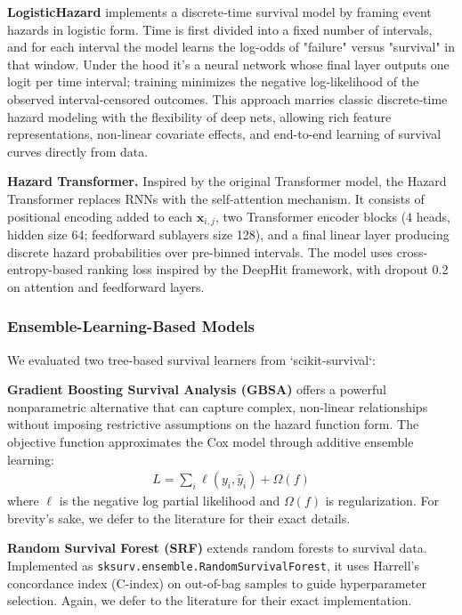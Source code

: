 \textbf{LogisticHazard} implements a discrete‐time survival model by framing event hazards in logistic form. Time is first divided into a fixed number of intervals, and for each interval the model learns the log-odds of "failure" versus "survival" in that window. Under the hood it's a neural network whose final layer outputs one logit per time interval; training minimizes the negative log‐likelihood of the observed interval‐censored outcomes. This approach marries classic discrete‐time hazard modeling with the flexibility of deep nets, allowing rich feature representations, non‐linear covariate effects, and end-to-end learning of survival curves directly from data.

\textbf{Hazard Transformer.} Inspired by the original Transformer model\citep{vaswani2017attention}, the Hazard Transformer \citep{hazard_transformer} replaces RNNs with the self-attention mechanism. It consists of positional encoding added to each $\mathbf{x}_{i,j}$, two Transformer encoder blocks (4 heads, hidden size 64; feedforward sublayers size 128), and a final linear layer producing discrete hazard probabilities over pre-binned intervals. The model uses cross-entropy-based ranking loss inspired by the DeepHit framework, with dropout 0.2 on attention and feedforward layers.

\subsubsection{Ensemble-Learning-Based Models}

We evaluated two tree-based survival learners from `scikit-survival`:

\textbf{Gradient Boosting Survival Analysis (GBSA)} \citep{chen2013gradient_GBSA} offers a powerful nonparametric alternative that can capture complex, non-linear relationships without imposing restrictive assumptions on the hazard function form. The objective function approximates the Cox model through additive ensemble learning:
\begin{align}
L = \sum_i \ell(y_i, \hat{y}_i) + \Omega(f)
\end{align}
where $\ell$ is the negative log partial likelihood and $\Omega(f)$ is regularization. For brevity's sake, we defer to the literature for their exact details.

\textbf{Random Survival Forest (SRF)} \citep{pickett2021random_survival_forests, ishwaran2008random} extends random forests to survival data. Implemented as \texttt{sksurv.ensemble.RandomSurvivalForest}, it uses Harrell's concordance index (C-index) on out-of-bag samples to guide hyperparameter selection. Again, we defer to the literature for their exact implementation. 

